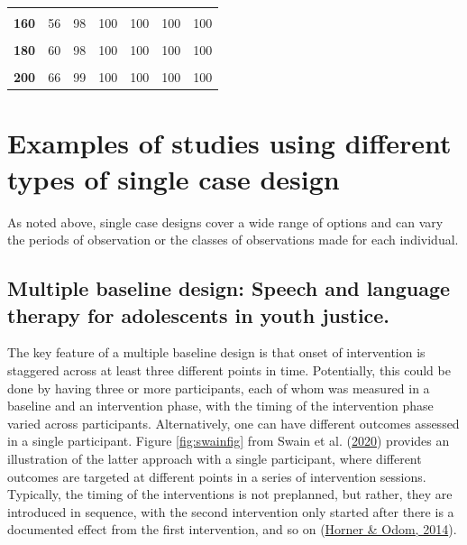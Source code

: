 \documentclass{krantz}
\begin{document}
\begin{table}
\begin{tabular}[t]{>{}ccccccc}
\textbf{\cellcolor{gray!6}{150}} & \cellcolor{gray!6}{52} & \cellcolor{gray!6}{97} & \cellcolor{gray!6}{100} & \cellcolor{gray!6}{100} & \cellcolor{gray!6}{100} & \cellcolor{gray!6}{100}\\
\addlinespace
\textbf{160} & 56 & 98 & 100 & 100 & 100 & 100\\
\textbf{\cellcolor{gray!6}{170}} & \cellcolor{gray!6}{57} & \cellcolor{gray!6}{98} & \cellcolor{gray!6}{100} & \cellcolor{gray!6}{100} & \cellcolor{gray!6}{100} & \cellcolor{gray!6}{100}\\
\textbf{180} & 60 & 98 & 100 & 100 & 100 & 100\\
\textbf{\cellcolor{gray!6}{190}} & \cellcolor{gray!6}{61} & \cellcolor{gray!6}{99} & \cellcolor{gray!6}{100} & \cellcolor{gray!6}{100} & \cellcolor{gray!6}{100} & \cellcolor{gray!6}{100}\\
\textbf{200} & 66 & 99 & 100 & 100 & 100 & 100\\
\bottomrule
\end{tabular}
\end{table}

\hypertarget{examples-of-studies-using-different-types-of-single-case-design}{%
\section{Examples of studies using different types of single case design}\label{examples-of-studies-using-different-types-of-single-case-design}}

As noted above, single case designs cover a wide range of options and can vary the periods of observation or the classes of observations made for each individual.

\hypertarget{multiple-baseline-design-speech-and-language-therapy-for-adolescents-in-youth-justice.}{%
\subsection{Multiple baseline design: Speech and language therapy for adolescents in youth justice.}\label{Multiple-baseline-design-speech-and-language-therapy-for-adolescents-in-youth-justice.}}

The key feature of a multiple baseline design is that onset of intervention is staggered across at least three different points in time. Potentially, this could be done by having three or more participants, each of whom was measured in a baseline and an intervention phase, with the timing of the intervention phase varied across participants. Alternatively, one can have different outcomes assessed in a single participant. Figure \ref{fig:swainfig} from Swain et al. (\protect\hyperlink{ref-swain2020}{2020}) provides an illustration of the latter approach with a single participant, where different outcomes are targeted at different points in a series of intervention sessions. Typically, the timing of the interventions is not preplanned, but rather, they are introduced in sequence, with the second intervention only started after there is a documented effect from the first intervention, and so on (\protect\hyperlink{ref-horner2014}{Horner \& Odom, 2014}).
\end{document}
